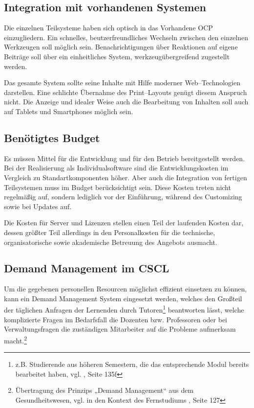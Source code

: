 \subsection{Integration mit vorhandenen Systemen} %
\label{sub:integration_mit_vorhandenen_systemen}
Die einzelnen Teilsysteme haben sich optisch in das Vorhandene \ac{OCP} einzugliedern. Ein schnelles, beutzerfreundliches Wechseln zwischen den einzelnen Werkzeugen soll möglich sein. Benachrichtigungen über Reaktionen auf eigene Beiträge soll über ein einheitliches System, werkzeugübergreifend zugestellt werden.

Das gesamte System sollte seine Inhalte mit Hilfe moderner Web–Technologien darstellen. Eine schlichte Übernahme des Print–Layouts genügt diesem Anspruch nicht. Die Anzeige und idealer Weise auch die Bearbeitung von Inhalten soll auch auf Tablets und Smartphones möglich sein.
 

\subsection{Benötigtes Budget} %
\label{sub:benotigtes_budget}
Es müssen Mittel für die Entwicklung und für den Betrieb bereitgestellt werden. Bei der Realisierung als Individualsoftware sind die Entwicklungskosten im Vergleich zu Standartkomponenten höher. Aber auch die Integration von fertigen Teilsystemen muss im Budget berücksichtigt sein. Diese Kosten treten nicht regelmäßig auf, sondern lediglich vor der Einführung, während des Customizing sowie bei Updates auf.

Die Kosten für Server und Lizenzen stellen einen Teil der laufenden Kosten dar, dessen größter Teil allerdings in den Personalkosten für die technische, organisatorische sowie akademische Betreuung des Angebots ausmacht.


\subsection{Demand Management im CSCL} %
\label{sub:demand_management}
Um die gegebenen personellen Resourcen möglichst effizient einsetzen zu können, kann ein Demand Management System eingesetzt werden, welches den Großteil der täglichen Anfragen der Lernenden durch Tutoren\footnote{z.B. Studierende aus höheren Semestern, die das entsprechende Modul bereits bearbeitet haben, vgl. \cite{ojstersek}, Seite 135f} beantworten lässt, welche komplizierte Fragen im Bedarfsfall die Dozenten bzw. Professoren oder bei Verwaltungsfragen  die zuständigen Mitarbeiter auf die Probleme aufmerksam macht.\footnote{Übertragung des Prinzips „Demand Management“ aus dem Gesundheitswesen, vgl. \cite{gabler:demandmanagement} in den Kontext des Fernstudiums \cite{ojstersek}, Seite 127}

